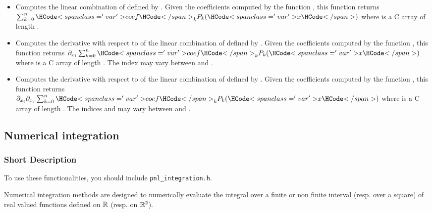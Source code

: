 \begin{itemize}
  \item {}
    \sshortdescribe Computes the linear combination of  defined by
    . Given the coefficients computed by the function
    , this function returns $\sum_{k=0}^n
    \var{coef}_k  P_k(\var{x})$ where  is a C array of length
    .

  \item {}
    \sshortdescribe Computes the derivative with respect to  of the
    linear combination of  defined by . Given the
    coefficients computed by the function , this
    function returns $\partial_{x_i} \sum_{k=0}^n \var{coef}_k  P_k(\var{x})$
    where  is a C array of length . The index 
    may vary between  and .


  \item {}
    \sshortdescribe Computes the derivative with respect to  of the
    linear combination of  defined by . Given the
    coefficients computed by the function , this
    function returns $\partial_{x_i} \partial_{x_j} \sum_{k=0}^n \var{coef}_k  P_k(\var{x})$
    where  is a C array of length . The indices 
    and  may vary between  and .
\end{itemize}


\subsection{Numerical integration}
\subsubsection{Short Description}

To use these functionalities, you should include \verb!pnl_integration.h!.

Numerical integration methods are designed to numerically evaluate the integral
over a finite or non finite interval (resp. over a square) of real valued
functions defined on ${\mathbb R}$ (resp. on ${\mathbb R}^2$).

